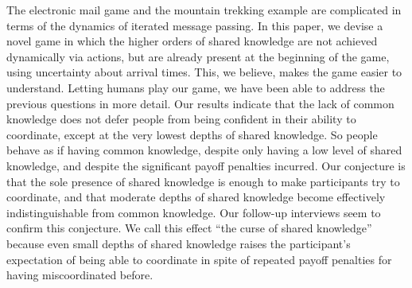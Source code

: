 The electronic mail game and the mountain trekking example are complicated in terms of the dynamics of iterated message passing. In this paper, we devise a novel game in which the higher orders of shared knowledge are not achieved dynamically via actions, but are already present at the beginning of the game, using uncertainty about arrival times. This, we believe, makes the game easier to understand. Letting humans play our game, we have been able to address the previous questions in more detail. Our results indicate that the lack of common knowledge does not defer people from being confident in their ability to coordinate, except at the very lowest depths of shared knowledge. So people behave as if having common knowledge, despite only having a low level of shared knowledge, and despite the significant payoff penalties incurred. %
Our conjecture is that the sole presence of shared knowledge is enough to make participants try to coordinate, and that moderate depths of shared knowledge become effectively indistinguishable from common knowledge. 
Our follow-up interviews seem to confirm this conjecture. 
We call this effect ``the curse of shared knowledge'' because even small depths of shared knowledge raises the participant's expectation of being able to coordinate in spite of repeated payoff penalties for having miscoordinated before.

